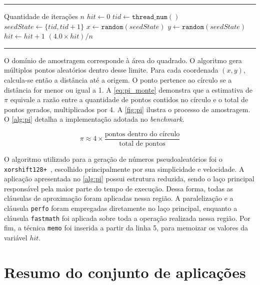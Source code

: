  \begin{sourcecode}[htb]
    \caption{Cálculo de PI pelo método de Monte Carlo.}
    \label{alg:pi}
    \hrule
    \begin{algorithmic}[1]
        \REQUIRE Quantidade de iterações $n$
        \STATE $hit \gets 0$
        \STATE $tid \gets \texttt{thread\_num}()$
        \STATE $seedState \gets \{tid, tid + 1\}$
        \STATE $x \gets \texttt{random}(seedState)$
        \STATE $y \gets \texttt{random}(seedState)$
        \STATE $hit \gets hit + 1$
        \ENDIF
        \ENDFOR
        \RETURN $(4.0 \times hit) / n$
    \end{algorithmic}
    \hrule
    \fonte{}
\end{sourcecode} 

O domínio de amostragem corresponde à área do quadrado. O algoritmo gera múltiplos pontos aleatórios dentro desse limite. Para cada coordenada $(x,y)$, calcula-se então a distância até a origem. O ponto pertence ao círculo se a distância for menor ou igual a 1. A \autoref{eq:pi_monte} demonstra que a estimativa de $\pi$ equivale a razão entre a quantidade de pontos contidos no círculo e o total de pontos gerados, multiplicados por 4. A \autoref{fig:pi} ilustra o processo de amostragem. O \autoref{alg:pi} detalha a implementação adotada no \textit{benchmark}.

\begin{equation}
\label{eq:pi_monte}
\pi \approx 4 \times \frac{\text{pontos dentro do círculo}}{\text{total de pontos}}
\end{equation}

O algoritmo utilizado para a geração de números pseudoaleatórios foi o \texttt{xorshift128+}~\cite{vigna2017}, escolhido principalmente por sua simplicidade e velocidade. A aplicação apresentada no \autoref{alg:pi} possui estrutura reduzida, sendo o laço principal responsável pela maior parte do tempo de execução. Dessa forma, todas as cláusulas de aproximação foram aplicadas nessa região. A paralelização e a cláusula \texttt{perfo} foram empregadas diretamente no laço principal, enquanto a cláusula \texttt{fastmath} foi aplicada sobre toda a operação realizada nessa região. Por fim, a técnica \texttt{memo} foi inserida a partir da linha 5, para memoizar os valores da variável $hit$.

\section{Resumo do conjunto de aplicações}\label{sec:resumo_exp}

